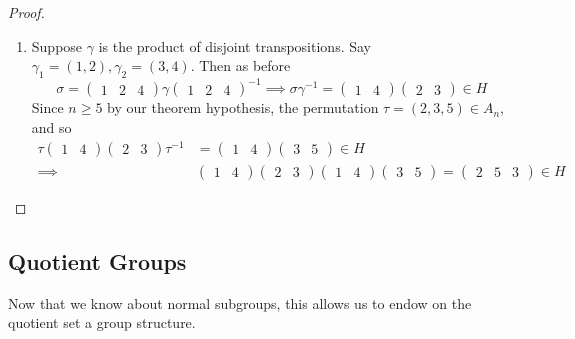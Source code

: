 \begin{proof}
\begin{enumerate}
      \item Suppose $\gamma$ is the product of disjoint transpositions. Say $\gamma_1 = (1, 2), \gamma_2 = (3, 4)$. Then as before 
      \begin{equation}
        \sigma = \begin{pmatrix} 1 & 2 & 4 \end{pmatrix} \gamma \begin{pmatrix} 1 & 2 & 4 \end{pmatrix}^{-1}  \implies \sigma \gamma^{-1} = \begin{pmatrix} 1 & 4 \end{pmatrix} \begin{pmatrix} 2 & 3 \end{pmatrix} \in H
      \end{equation}
      Since $n \geq 5$ by our theorem hypothesis, the permutation $\tau = (2, 3, 5) \in A_n$, and so 
      \begin{align}
        \tau \begin{pmatrix} 1 & 4 \end{pmatrix} \begin{pmatrix} 2 & 3 \end{pmatrix} \tau^{-1} & = \begin{pmatrix} 1 & 4 \end{pmatrix} \begin{pmatrix} 3 & 5 \end{pmatrix} \in H \\
            \implies & \begin{pmatrix} 1 & 4 \end{pmatrix} \begin{pmatrix} 2 & 3 \end{pmatrix} \begin{pmatrix} 1 & 4 \end{pmatrix} \begin{pmatrix} 3 & 5 \end{pmatrix} = \begin{pmatrix} 2 & 5 & 3 \end{pmatrix} \in H
      \end{align}
    \end{enumerate}
  \end{proof}

\subsection{Quotient Groups}

  Now that we know about normal subgroups, this allows us to endow on the quotient set a group structure. 

